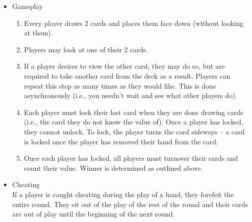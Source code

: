 \documentclass[11pt]{article}
\begin{document}
\begin{itemize}
\item Gameplay\\
\label{sec-2-2-2-2}%
\begin{enumerate}
\item Every player draws 2 cards and places them face down (without
   looking at them).
\item Players may look at one of their 2 cards.
\item If a player desires to view the other card, they may do so, but
   are required to take another card from the deck as a result.
   Players can repeat this step as many times as they would like. This
   is done asynchronously (i.e., you needn't wait and see what other
   players do).
\item Each player must lock their last card when they are done
   drawing cards (i.e., the card they do not know the value of). Once
   a player has locked, they cannot unlock. To lock, the player turns
   the card sideways -- a card is locked once the player has removed
   their hand from the card.
\item Once each player has locked, all players must turnover their cards
   and count their value. Winner is determined as
   outlined above.
\end{enumerate}

\item Cheating\\
\label{sec-2-2-2-2-3}%
If a player is caught cheating during the play of a hand, they forefeit 
the entire round. They sit out of the play of the rest of the round and 
their cards are out of play until the beginning of the next round. 

\end{itemize} %
\end{document}
